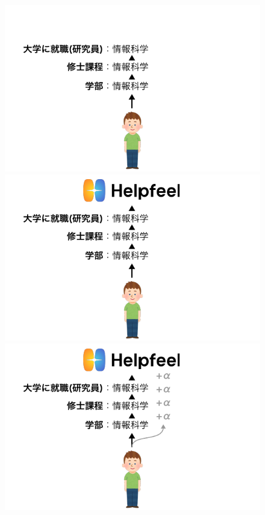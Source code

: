 \documentclass[lualatex,aspectratio=169]{beamer}
\begin{document}
\begin{frame}[t]
\begin{figure}
\begin{overprint}
            \begin{center}\includegraphics[width=0.8\linewidth]{./img/intro_8.pdf}\end{center}
            \begin{center}\includegraphics[width=0.8\linewidth]{./img/intro_9.pdf}\end{center}

            \begin{center}\includegraphics[width=0.8\linewidth]{./img/intro_10.pdf}\end{center}
        \end{overprint}
    \end{figure}
\end{frame}
\end{document}
